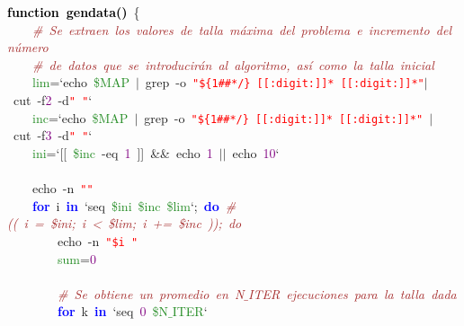 \mbox{}\textbf{\textcolor{Black}{function\ gendata()}}\ \{ \\
\mbox{}\ \ \ \ \textit{\textcolor{Brown}{\#\ Se\ extraen\ los\ valores\ de\ talla\ máxima\ del\ problema\ e\ incremento\ del\ número}} \\
\mbox{}\ \ \ \ \textit{\textcolor{Brown}{\#\ de\ datos\ que\ se\ introducirán\ al\ algoritmo,\ así\ como\ la\ talla\ inicial}} \\
\mbox{}\ \ \ \ \textcolor{ForestGreen}{lim}\textcolor{BrickRed}{=}`echo\ \textcolor{ForestGreen}{\$MAP}\ \textcolor{BrickRed}{$|$}\ grep\ -o\ \texttt{\textcolor{Red}{"{}\$\{1\#\#*/\}\ [[:digit:]]*\ [[:digit:]]*"{}}}\textcolor{BrickRed}{$|$}\ cut\ -f\textcolor{Purple}{2}\ -d\texttt{\textcolor{Red}{"{}\ "{}}}` \\
\mbox{}\ \ \ \ \textcolor{ForestGreen}{inc}\textcolor{BrickRed}{=}`echo\ \textcolor{ForestGreen}{\$MAP}\ \textcolor{BrickRed}{$|$}\ grep\ -o\ \texttt{\textcolor{Red}{"{}\$\{1\#\#*/\}\ [[:digit:]]*\ [[:digit:]]*"{}}}\ \textcolor{BrickRed}{$|$}\ cut\ -f\textcolor{Purple}{3}\ -d\texttt{\textcolor{Red}{"{}\ "{}}}` \\
\mbox{}\ \ \ \ \textcolor{ForestGreen}{ini}\textcolor{BrickRed}{=}`\textcolor{BrickRed}{[[}\ \textcolor{ForestGreen}{\$inc}\ -eq\ \textcolor{Purple}{1}\ \textcolor{BrickRed}{]]}\ \textcolor{BrickRed}{\&\&}\ echo\ \textcolor{Purple}{1}\ \textcolor{BrickRed}{$|$$|$}\ echo\ \textcolor{Purple}{10}` \\
\mbox{}\ \ \ \  \\
\mbox{}\ \ \ \ echo\ -n\ \texttt{\textcolor{Red}{"{}"{}}} \\
\mbox{}\ \ \ \ \textbf{\textcolor{Blue}{for}}\ i\ \textbf{\textcolor{Blue}{in}}\ `seq\ \textcolor{ForestGreen}{\$ini}\ \textcolor{ForestGreen}{\$inc}\ \textcolor{ForestGreen}{\$lim}`\textcolor{BrickRed}{;}\ \textbf{\textcolor{Blue}{do}}\ \textit{\textcolor{Brown}{\#((\ i\ =\ \$ini;\ i\ \textless{}\ \$lim;\ i\ +=\ \$inc\ ));\ do}} \\
\mbox{}\ \ \ \ \ \ \ \ echo\ -n\ \texttt{\textcolor{Red}{"{}\$i\ "{}}} \\
\mbox{}\ \ \ \ \ \ \ \ \textcolor{ForestGreen}{sum}\textcolor{BrickRed}{=}\textcolor{Purple}{0} \\
\mbox{}\ \ \ \ \ \ \ \  \\
\mbox{}\ \ \ \ \ \ \ \ \textit{\textcolor{Brown}{\#\ Se\ obtiene\ un\ promedio\ en\ N$\_$ITER\ ejecuciones\ para\ la\ talla\ dada}} \\
\mbox{}\ \ \ \ \ \ \ \ \textbf{\textcolor{Blue}{for}}\ k\ \textbf{\textcolor{Blue}{in}}\ `seq\ \textcolor{Purple}{0}\ \textcolor{ForestGreen}{\$N$\_$ITER}` \\
